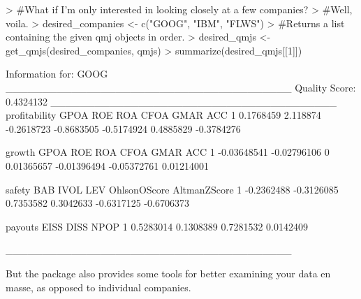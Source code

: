 \documentclass[titlepage]{article}
\begin{document}
\begin{Schunk}
\begin{Sinput}
> #What if I'm only interested in looking closely at a few companies? 
> #Well, voila.
> desired_companies <- c("GOOG", "IBM", "FLWS")
> #Returns a list containing the given qmj objects in order.
> desired_qmjs <- get_qmjs(desired_companies, qmjs) 
> summarize(desired_qmjs[[1]])
\end{Sinput}
\begin{Soutput}
Information for:  GOOG
_______________________________________
Quality Score:  0.4324132
_______________________________________
  profitability     GPOA        ROE        ROA       CFOA      GMAR        ACC
1     0.1768459 2.118874 -0.2618723 -0.8683505 -0.5174924 0.4885829 -0.3784276


       growth        GPOA ROE        ROA        CFOA        GMAR        ACC
1 -0.03648541 -0.02796106   0 0.01365657 -0.01396494 -0.05372761 0.01214001


      safety        BAB      IVOL       LEV OhlsonOScore AltmanZScore
1 -0.2362488 -0.3126085 0.7353582 0.3042633   -0.6317125   -0.6706373


    payouts      EISS      DISS      NPOP
1 0.5283014 0.1308389 0.7281532 0.0142409

_______________________________________
\end{Soutput}
\end{Schunk}

But the package also provides some tools for better examining your data en masse, as opposed to individual companies.
\end{document}
